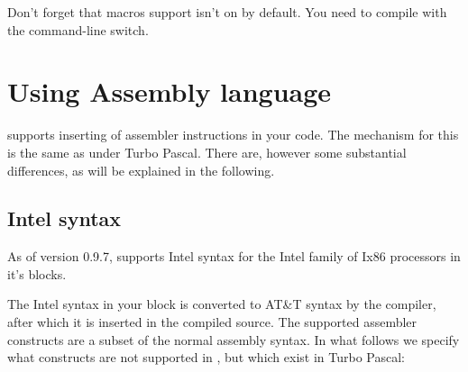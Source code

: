 \begin{remark}Don't forget that macros support isn't on by default. You
need to compile with the  command-line switch.
\end{remark}

\chapter{Using Assembly language}
\label{ch:AsmLang}
\fpc supports inserting of assembler instructions in your code. The
mechanism for this is the same as under Turbo Pascal. There are, however
some substantial differences, as will be explained in the following.

\section{Intel syntax}
\label{se:Intel}

As of version 0.9.7, \fpc supports Intel syntax for the Intel family of Ix86
processors  in it's  blocks.

The Intel syntax in your  block is converted to AT\&T syntax by the
compiler, after which it is inserted in the compiled source.
The supported assembler constructs are a subset of the normal assembly
syntax. In what follows we specify what constructs are not supported in
\fpc, but which exist in Turbo Pascal:

